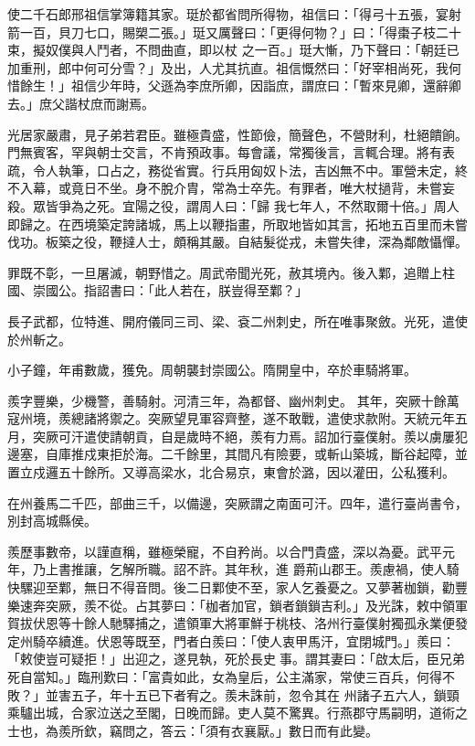 \begin{pinyinscope}
 使二千石郎邢祖信掌簿籍其家。珽於都省問所得物，祖信曰：「得弓十五張，宴射箭一百，貝刀七口，賜槊二張。」珽又厲聲曰：「更得何物？」曰：「得棗子枝二十束，擬奴僕與人鬥者，不問曲直，即以杖
 之一百。」珽大慚，乃下聲曰：「朝廷已加重刑，郎中何可分雪？」及出，人尤其抗直。祖信慨然曰：「好宰相尚死，我何惜餘生！」祖信少年時，父遜為李庶所卿，因詣庶，謂庶曰：「暫來見卿，還辭卿去。」庶父諧杖庶而謝焉。



 光居家嚴肅，見子弟若君臣。雖極貴盛，性節儉，簡聲色，不營財利，杜絕饋餉。門無賓客，罕與朝士交言，不肯預政事。每會議，常獨後言，言輒合理。將有表疏，令人執筆，口占之，務從省實。行兵用匈奴卜法，吉凶無不中。軍營未定，終不入幕，或竟日不坐。身不脫介胄，常為士卒先。有罪者，唯大杖撾背，未嘗妄殺。眾皆爭為之死。宜陽之役，謂周人曰：「歸
 我七年人，不然取爾十倍。」周人即歸之。在西境築定誇諸城，馬上以鞭指畫，所取地皆如其言，拓地五百里而未嘗伐功。板築之役，鞭撻人士，頗稱其嚴。自結髮從戎，未嘗失律，深為鄰敵懾憚。



 罪既不彰，一旦屠滅，朝野惜之。周武帝聞光死，赦其境內。後入鄴，追贈上柱國、崇國公。指詔書曰：「此人若在，朕豈得至鄴？」



 長子武都，位特進、開府儀同三司、梁、袞二州刺史，所在唯事聚斂。光死，遣使於州斬之。



 小子鐘，年甫數歲，獲免。周朝襲封崇國公。隋開皇中，卒於車騎將軍。



 羨字豐樂，少機警，善騎射。河清三年，為都督、幽州刺史。
 其年，突厥十餘萬寇州境，羨總諸將禦之。突厥望見軍容齊整，遂不敢戰，遣使求款附。天統元年五月，突厥可汗遣使請朝貢，自是歲時不絕，羨有力焉。詔加行臺僕射。羨以虜屢犯邊塞，自庫推戍東拒於海。二千餘里，其間凡有險要，或斬山築城，斷谷起障，並置立戍邏五十餘所。又導高梁水，北合易京，東會於潞，因以灌田，公私獲利。



 在州養馬二千匹，部曲三千，以備邊，突厥謂之南面可汗。四年，遣行臺尚書令，別封高城縣侯。



 羨歷事數帝，以謹直稱，雖極榮寵，不自矜尚。以合門貴盛，深以為憂。武平元年，乃上書推讓，乞解所職。詔不許。其年秋，進
 爵荊山郡王。羨慮禍，使人騎快騾迎至鄴，無日不得音問。後二日鄴使不至，家人乞養憂之。又夢著枷鎖，勸豐樂速奔突厥，羨不從。占其夢曰：「枷者加官，鎖者鎖鎖吉利。」及光誅，敕中領軍賀拔伏恩等十餘人馳驛捕之，遣領軍大將軍鮮于桃枝、洛州行臺僕射獨孤永業便發定州騎卒續進。伏恩等既至，門者白羨曰：「使人衷甲馬汗，宜閉城門。」羨曰：「敕使豈可疑拒！」出迎之，遂見執，死於長史事。謂其妻曰：「啟太后，臣兄弟死自當知。」臨刑歎曰：「富貴如此，女為皇后，公主滿家，常使三百兵，何得不敗？」並害五子，年十五已下者宥之。羨未誅前，忽令其在
 州諸子五六人，鎖頸乘驢出城，合家泣送之至閣，日晚而歸。吏人莫不驚異。行燕郡守馬嗣明，道術之士也，為羨所欽，竊問之，答云：「須有衣襄厭。」數日而有此變。




\end{pinyinscope}
